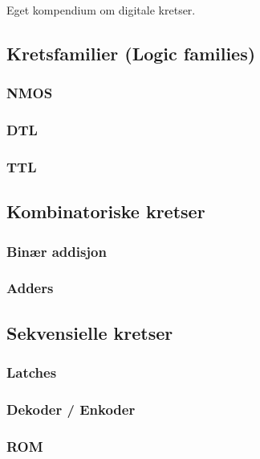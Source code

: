 Eget kompendium om digitale kretser.

\subsection{Kretsfamilier (Logic families)}
  

  \subsubsection{NMOS}
    

  \subsubsection{DTL}
    

  \subsubsection{TTL}
    

\subsection{Kombinatoriske kretser}
  

  \subsubsection{Binær addisjon}
    

  \subsubsection{Adders}
    

\subsection{Sekvensielle kretser}
    

  \subsubsection{Latches}
    

  \subsubsection{Dekoder / Enkoder}
    

  \subsubsection{ROM}
    

